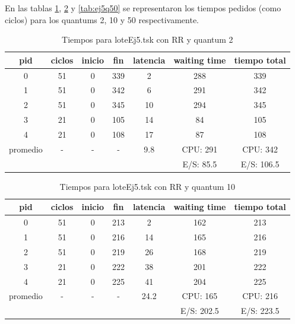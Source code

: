 En las tablas \ref{tab:ej5q2},  \ref{tab:ej5q10} y \ref{tab:ej5q50} se representaron los tiempos pedidos (como ciclos) para los quantums 2, 10 y 50 respectivamente.
\begin{table}[H]
\centering
\begin{tabular}{ | c | c | c | c | c | c | c | }
  \hline			
  pid & ciclos & inicio & fin & latencia & waiting time & tiempo total  \\
  \hline
 0 & 51 & 0 & 339 & 2 & 288 & 339\\
1 & 51 & 0 & 342 & 6 & 291 & 342\\
2 & 51 & 0 & 345 & 10 & 294 & 345\\
3 & 21 & 0 & 105 & 14 & 84 & 105\\
4 & 21 & 0 & 108 & 17 & 87 & 108\\
  \hline
promedio & - & - & - & 9.8 & CPU: 291  & CPU: 342 \\
                & &  &  &  & E/S: 85.5  & E/S: 106.5\\
  \hline
\end{tabular}
\caption{Tiempos para loteEj5.tsk con RR y quantum 2}\label{tab:ej5q2}
\end{table}

\begin{table}[H]
\centering
\begin{tabular}{ | c | c | c | c | c | c | c | }
  \hline			
  pid & ciclos & inicio & fin & latencia & waiting time & tiempo total  \\
  \hline
0 & 51 & 0 & 213 & 2 & 162 & 213\\
1 & 51 & 0 & 216 & 14 & 165 & 216\\
2 & 51 & 0 & 219 & 26 & 168 & 219\\
3 & 21 & 0 & 222 & 38 & 201 & 222\\
4 & 21 & 0 & 225 & 41 & 204 & 225\\
  \hline
promedio & - & - & - & 24.2 & CPU: 165  & CPU: 216\\
                & &  &  &  & E/S: 202.5  & E/S: 223.5\\
\hline
\end{tabular}
\caption{Tiempos para loteEj5.tsk con RR y quantum 10}\label{tab:ej5q10}
\end{table}

